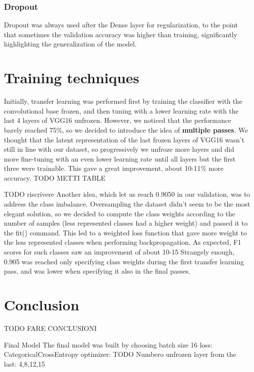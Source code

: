 \documentclass[conference,compsoc,11pt]{IEEEtran}
\begin{document}
\subsubsection{Dropout} Dropout was always used after the Dense layer for regularization, to the point that sometimes the validation accuracy was higher than training, significantly highlighting the generalization of the model.


\section{Training techniques}

Initially, transfer learning was performed first by training the classifier with the convolutional base frozen, and then tuning with a lower learning rate with the last 4 layers of VGG16 unfrozen. However, we noticed that the performance barely reached 75\%, so we decided to introduce the idea of \textbf{multiple passes}. We thought that the latent representation of the last frozen layers of VGG16 wasn't still in line with our dataset, so progressively we unfroze more layers and did more fine-tuning with an even lower learning rate until all layers but the first three were trainable.
This gave a great improvement, about 10-11\% more accuracy. TODO METTI TABLE

TODO riscrivere
Another idea, which let us reach 0.9050 in our validation, was to address the class imbalance. Oversampling the dataset didn’t seem to be the most elegant solution, so we decided to compute the class weights according to the number of samples (less represented classes had a higher weight) and passed it to the fit() command. This led to a weighted loss function that gave more weight to the less represented classes when performing backpropagation. As expected, F1 scores for such classes saw an improvement of about 10-15%
Strangely enough, 0.905 was reached only specifying class weights during the first transfer learning pass, and was lower when specifying it also in the final passes.




\section{Conclusion}

TODO FARE CONCLUSIONI

Final Model
The final model was built by choosing
batch size 16
loss: CategoricalCrossEntropy
optimizer: TODO
Numbero unfrozen layer from the last: 4,8,12,15
\end{document}
